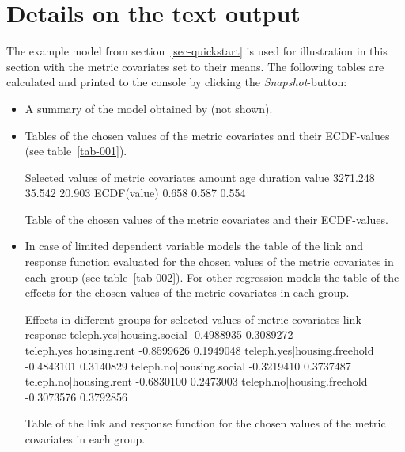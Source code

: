 \documentclass[nojss]{jss}
\begin{document}
\section{Details on the text output} \label{sec-output}
The example model from section~\ref{sec-quickstart} is used for illustration in this section with the metric covariates set to their means. The following tables are calculated and printed to the console by clicking the \emph{Snapshot}-button: 
\begin{itemize} [leftmargin=1cm, label=$\bullet$]
\item A summary of the model obtained by  (not shown).
\item Tables of the chosen values of the metric covariates and their ECDF-values (see table~\ref{tab-001}).

\begin{table}[ht]
\centering
\begin{minipage}[c]{8cm}
\begin{CodeChunk}
\small
\begin{CodeOutput}
Selected values of metric covariates
              amount    age duration
value       3271.248 35.542   20.903
ECDF(value)    0.658  0.587    0.554
\end{CodeOutput}
\end{CodeChunk}
\end{minipage}
\caption{Table of the chosen values of the metric covariates and their ECDF-values.} \label{tab-001}
\end{table}

\item In case of limited dependent variable models the table of the link and response function evaluated for the chosen values of the metric covariates in each group (see table~\ref{tab-002}). For other regression models the table of the effects for the chosen values of the metric covariates in each group.

\begin{table}[ht]
\centering
\begin{minipage}[c]{11cm}
\begin{CodeChunk}
\small
\begin{CodeOutput}
Effects in different groups for selected values of metric covariates
                                  link  response
teleph.yes|housing.social   -0.4988935 0.3089272
teleph.yes|housing.rent     -0.8599626 0.1949048
teleph.yes|housing.freehold -0.4843101 0.3140829
teleph.no|housing.social    -0.3219410 0.3737487
teleph.no|housing.rent      -0.6830100 0.2473003
teleph.no|housing.freehold  -0.3073576 0.3792856
\end{CodeOutput}
\end{CodeChunk}
\end{minipage}
\caption{Table of the link and response function for the chosen values of the metric covariates in each group.} \label{tab-002}
\end{table}


\end{itemize}
\end{document}
